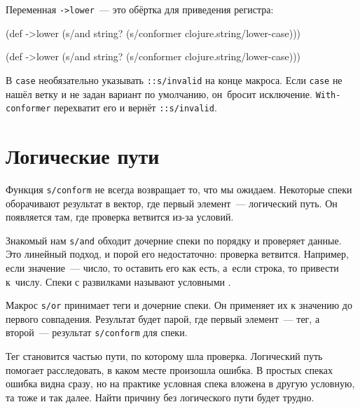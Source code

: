\fi

\noindent
Переменная \verb|->lower|~--- это обёртка для приведения регистра:

\ifx\DEVICETYPE\MOBILE

\begin{english}
  \begin{clojure}
(def ->lower
  (s/and
    string?
    (s/conformer
      clojure.string/lower-case)))
  \end{clojure}
\end{english}
\else

\begin{english}
  \begin{clojure}
(def ->lower
  (s/and
    string?
    (s/conformer clojure.string/lower-case)))
  \end{clojure}
\end{english}

\fi

\mnoindent
В \verb|case| необязательно указывать \verb|::s/invalid| на конце
макроса. Если \verb|case| не нашёл ветку и не задан вариант по умолчанию,
он~бросит исключение. \verb|With-conformer| перехватит его и вернёт
\verb|::s/invalid|.

\section{Логические пути}


Функция \verb|s/conform| не всегда возвращает то, что мы ожидаем. Некоторые
спеки оборачивают результат в вектор, где первый элемент~--- логический путь. Он
появляется там, где проверка ветвится из-за условий.

Знакомый нам \verb|s/and| обходит дочерние спеки по порядку и проверяет
данные. Это линейный подход, и порой его недостаточно: проверка
ветвится. Например, если значение~--- число, то оставить его как есть, а~если
строка, то привести к~числу. Спеки с развилками называют условными
.

Макрос \verb|s/or| принимает теги и дочерние спеки. Он применяет их к значению
до первого совпадения. Результат будет парой, где первый элемент~--- тег, а
второй~--- результат \verb|s/conform| для спеки.

Тег становится частью пути, по которому шла проверка. Логический путь помогает
расследовать, в каком месте произошла ошибка. В простых спеках ошибка видна
сразу, но на практике условная спека вложена в другую условную, та тоже и так
далее. Найти причину без логического пути будет трудно.

